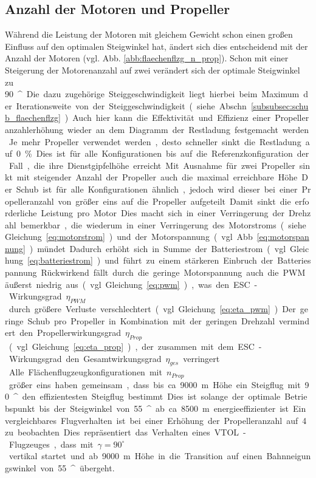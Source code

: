 \subsection{Anzahl der Motoren und Propeller}
\label{subsec:anz_mot_flaechenflzg}
Während die Leistung der Motoren mit gleichem Gewicht schon einen großen Einfluss auf den optimalen Steigwinkel hat, ändert sich dies entscheidend mit der Anzahl der Motoren (vgl. Abb. \ref{abb:flaechenflzg_n_prop}). Schon mit einer Steigerung der Motorenanzahl auf zwei verändert sich der optimale Steigwinkel zu \SI{90}{^\circ}. Die dazu zugehörige Steiggeschwindigkeit liegt hierbei beim Maximum der Iterationsweite von der Steiggeschwindigkeit (siehe Abschn. \ref{subsubsec:schub_flaechenflzg}).
Auch hier kann die Effektivität und Effizienz einer Propelleranzahlerhöhung wieder an dem Diagramm der Restladung festgemacht werden. Je mehr Propeller verwendet werden, desto schneller sinkt die Restladung auf \SI{0}{\%}. Dies ist für alle Konfigurationen bis auf die Referenzkonfiguration der Fall, die ihre Dienstgipfelhöhe erreicht. Mit Ausnahme für zwei Propeller sinkt mit steigender Anzahl der Propeller auch die maximal erreichbare Höhe. Der Schub ist für alle Konfigurationen ähnlich, jedoch wird dieser bei einer Propelleranzahl von größer eins auf die Propeller aufgeteilt. Damit sinkt die erforderliche Leistung pro Motor. Dies macht sich in einer Verringerung der Drehzahl bemerkbar, die wiederum in einer Verringerung des Motorstroms (siehe Gleichung \eqref{eq:motorstrom}) und der Motorspannung (vgl. Abb. \eqref{eq:motorspannung}) mündet. Dadurch erhöht sich in Summe der Batteriestrom (vgl. Gleichung \eqref{eq:batteriestrom}) und führt zu einem stärkeren Einbruch der Batteriespannung. Rückwirkend fällt durch die geringe Motorspannung auch die PWM äußerst niedrig aus (vgl. Gleichung \eqref{eq:pwm}), was den ESC-Wirkungsgrad \ensuremath{\eta_{PWM}} durch größere Verluste verschlechtert (vgl. Gleichung \eqref{eq:eta_pwm}). Der geringe Schub pro Propeller in Kombination mit der geringen Drehzahl vermindert den Propellerwirkungsgrad \ensuremath{\eta_{Prop}} (vgl. Gleichung \eqref{eq:eta_prop}), der zusammen mit dem ESC-Wirkungsgrad den Gesamtwirkungsgrad \ensuremath{\eta_{ges}} verringert.\\
Alle Flächenflugzeugkonfigurationen mit \ensuremath{n_{Prop}} größer eins haben gemeinsam, dass bis ca. \SI{9000}{m} Höhe ein Steigflug mit \SI{90}{^\circ} den effizientesten Steigflug bestimmt. 
Dies ist solange der optimale Betriebspunkt bis der Steigwinkel von \SI{55}{^\circ} ab ca. \SI{8500}{m} energieeffizienter ist. Ein vergleichbares Flugverhalten ist bei einer Erhöhung der Propelleranzahl auf 4 zu beobachten. Dies repräsentiert das Verhalten eines VTOL-Flugzeuges, dass mit \ensuremath{\gamma = 90^\circ} vertikal startet und ab \SI{9000}{m} Höhe in die Transition auf einen Bahnneigungswinkel von \SI{55}{^\circ} übergeht. 
